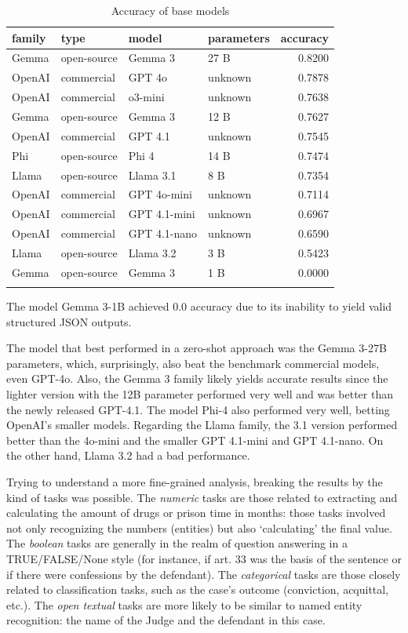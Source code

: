 \documentclass[
  12pt,
  letterpaper,
]{book}
\begin{document}
\begin{longtable}[t]{llllr}

\toprule
family & type & model & parameters & accuracy\\
\midrule
Gemma & open-source & Gemma 3 & 27 B & 0.8200\\
OpenAI & commercial & GPT 4o & unknown & 0.7878\\
OpenAI & commercial & o3-mini & unknown & 0.7638\\
Gemma & open-source & Gemma 3 & 12 B & 0.7627\\
OpenAI & commercial & GPT 4.1 & unknown & 0.7545\\
\addlinespace
Phi & open-source & Phi 4 & 14 B & 0.7474\\
Llama & open-source & Llama 3.1 & 8 B & 0.7354\\
OpenAI & commercial & GPT 4o-mini & unknown & 0.7114\\
OpenAI & commercial & GPT 4.1-mini & unknown & 0.6967\\
OpenAI & commercial & GPT 4.1-nano & unknown & 0.6590\\
\addlinespace
Llama & open-source & Llama 3.2 & 3 B & 0.5423\\
Gemma & open-source & Gemma 3 & 1 B & 0.0000\\
\bottomrule


\caption{\label{tbl-accuracy-metadata}Accuracy of base models}

\tabularnewline
\end{longtable}

The model Gemma 3-1B achieved 0.0 accuracy due to its inability to yield
valid structured JSON outputs.

The model that best performed in a zero-shot approach was the Gemma
3-27B parameters, which, surprisingly, also beat the benchmark
commercial models, even GPT-4o. Also, the Gemma 3 family likely yields
accurate results since the lighter version with the 12B parameter
performed very well and was better than the newly released GPT-4.1. The
model Phi-4 also performed very well, betting OpenAI's smaller models.
Regarding the Llama family, the 3.1 version performed better than the
4o-mini and the smaller GPT 4.1-mini and GPT 4.1-nano. On the other
hand, Llama 3.2 had a bad performance.

Trying to understand a more fine-grained analysis, breaking the results
by the kind of tasks was possible. The \emph{numeric} tasks are those
related to extracting and calculating the amount of drugs or prison time
in months: those tasks involved not only recognizing the numbers
(entities) but also `calculating' the final value. The \emph{boolean}
tasks are generally in the realm of question answering in a
TRUE/FALSE/None style (for instance, if art. 33 was the basis of the
sentence or if there were confessions by the defendant). The
\emph{categorical} tasks are those closely related to classification
tasks, such as the case's outcome (conviction, acquittal, etc.). The
\emph{open textual} tasks are more likely to be similar to named entity
recognition: the name of the Judge and the defendant in this case.
\end{document}
